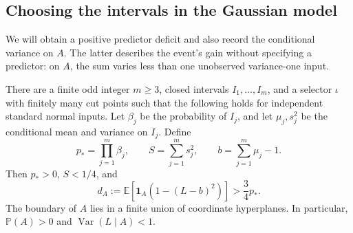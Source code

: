 \subsection{Choosing the intervals in the Gaussian model}

We will obtain a positive predictor deficit and also record the
conditional variance on $A$.  The latter describes the event's gain
without specifying a predictor: on $A$, the sum varies less than one
unobserved variance-one input.

\begin{lemma}\label{lem:gaussian}
There are a finite odd integer $m\ge3$, closed intervals
$I_1,\ldots,I_m$, and a selector $\iota$ with finitely many cut points
such that the following holds for independent standard normal inputs.
Let $\beta_j$ be the probability of $I_j$, and let $\mu_j,s_j^2$ be
the conditional mean and variance on $I_j$.  Define
\[
 p_* =\prod_{j=1}^m\beta_j,\qquad
 S=\sum_{j=1}^m s_j^2,\qquad
 b=\sum_{j=1}^m\mu_j-1.
\]
Then $p_*>0$, $S<1/4$, and
\begin{equation}\label{eq:deficit}
 d_A:=\mathbb E[\mathbf1_A(1-(L-b)^2)]>\frac34p_*.
\end{equation}
The boundary of $A$ lies in a finite union of coordinate hyperplanes.
In particular, $\mathbb P(A)>0$ and $\operatorname{Var}(L\mid A)<1$.
\end{lemma}

